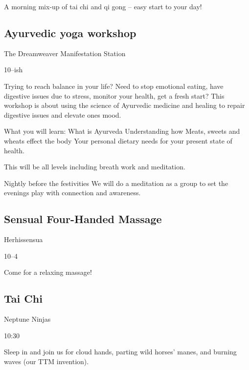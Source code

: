 \begin{multicols}{2}
A morning mix-up of tai chi and qi gong – easy start to your day!

\subsection*{Ayurvedic yoga workshop}
\begin{description}[leftmargin=6em,noitemsep,style=nextline]
	\item[Camp:] The Dreamweaver Manifestation Station
    \item[Times:] 10\am--ish
\end{description}

Trying to reach balance in your life? Need to stop emotional eating, have digestive issues due to stress, monitor your health, get a fresh start?
This workshop is about using the science of Ayurvedic medicine and healing to repair digestive issues and elevate ones mood.

What you will learn:
What is Ayurveda
Understanding how Meats, sweets and wheats effect the body
Your personal dietary needs for your present state of health. 

This will be all levels including breath work and meditation.

Nightly before the festivities We will do a meditation as a group to set the evenings play with connection and awareness.

\subsection*{Sensual Four-Handed Massage}
\begin{description}[leftmargin=6em,noitemsep,style=nextline]
	\item[Camp:] Herhissensua
  \item[Times:] 10\am--4\pm
\end{description}

Come for a relaxing massage!

\subsection*{Tai Chi}
\begin{description}[leftmargin=6em,noitemsep,style=nextline]
	\item[Camp:] Neptune Ninjas
  \item[Times:] 10:30\am
\end{description}

Sleep in and join us for cloud hands, parting wild horses’ manes, and burning waves (our TTM invention). 


\end{multicols}
